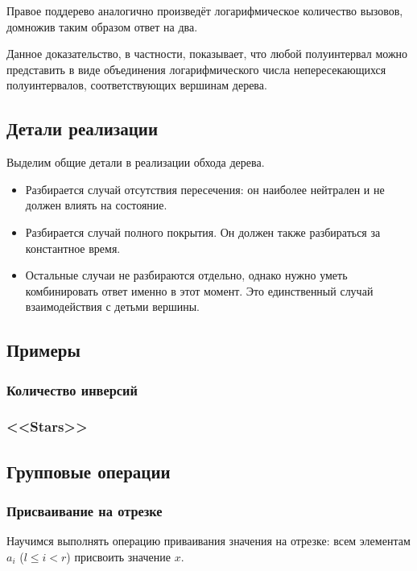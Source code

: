 \documentclass[a4paper,12pt]{article}
\begin{document}
    Правое поддерево аналогично произведёт логарифмическое
    количество вызовов, домножив таким образом ответ на два.

    Данное доказательство, в частности, показывает, что любой
    полуинтервал можно представить в виде объединения логарифмического
    числа непересекающихся полуинтервалов, соответствующих
    вершинам дерева.

    \subsection{Детали реализации}

    Выделим общие детали в реализации обхода дерева.
    \begin{itemize}
      \item Разбирается случай отсутствия пересечения: он наиболее
        нейтрален и не должен влиять на состояние.
      \item Разбирается случай полного покрытия. Он должен также
        разбираться за константное время.
      \item Остальные случаи не разбираются отдельно, однако
        нужно уметь комбинировать ответ именно в этот момент.
        Это единственный случай взаимодействия с детьми вершины.
    \end{itemize}

    \subsection{Примеры}
      \subsubsection{Количество инверсий}
      \subsubsection{<<Stars>>}

    \subsection{Групповые операции}

      \subsubsection{Присваивание на отрезке}

      Научимся выполнять операцию приваивания значения на отрезке:
      всем элементам $a_i$ ($l \le i < r$) присвоить значение $x$.
\end{document}
